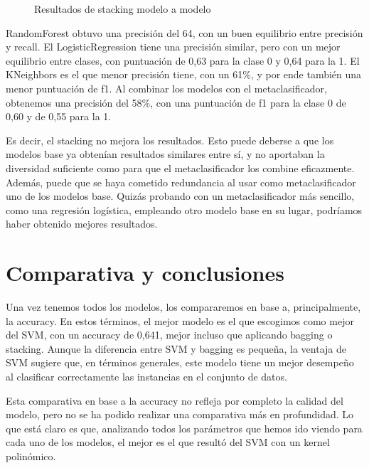 \documentclass[a4paper,onecolumn]{extarticle}
\let\stdsection\section
\renewcommand\section{\newpage\stdsection}
\begin{document}
\begin{sloppypar}
\begin{figure}[h!]
\begin{minipage}[c]{0.45\textwidth}
        \caption{Resultados de stacking modelo a modelo}
        \label{fig:stackingDetalle}
    \end{minipage}
\end{figure}

RandomForest obtuvo una precisión del 64, con un buen equilibrio entre precisión y recall. El LogisticRegression tiene una precisión similar, pero con un mejor 
equilibrio entre clases, con puntuación de 0,63 para la clase 0 y 0,64 para la 1. El KNeighbors es el que menor precisión tiene, con un 61\%, y por ende 
también una menor puntuación de f1. Al combinar los modelos con el metaclasificador, obtenemos una precisión del 58\%, con una puntuación de f1 para la clase 
0 de 0,60 y de 0,55 para la 1.

Es decir, el stacking no mejora los resultados. Esto puede deberse a que los modelos base ya obtenían resultados similares entre sí,
y no aportaban la diversidad suficiente como para que el metaclasificador los combine eficazmente. Además, puede que se haya cometido redundancia al usar como 
metaclasificador uno de los modelos base. Quizás probando con un metaclasificador más sencillo, como una regresión logística, empleando otro modelo base en su 
lugar, podríamos haber obtenido mejores resultados.

\section{Comparativa y conclusiones}\label{comparativa}
Una vez tenemos todos los modelos, los compararemos en base a, principalmente, la accuracy. En estos términos, el mejor modelo es el que escogimos como mejor 
del SVM, con un accuracy de 0,641, mejor incluso que aplicando bagging o stacking. Aunque la diferencia entre SVM y bagging es pequeña, la ventaja de SVM sugiere
que, en términos generales, este modelo tiene un mejor desempeño al clasificar correctamente las instancias en el conjunto de datos.

Esta comparativa en base a la accuracy no refleja por completo la calidad del modelo, pero no se ha podido realizar una comparativa más en profundidad. Lo que 
está claro es que, analizando todos los parámetros que hemos ido viendo para cada uno de los modelos, el mejor es el que resultó del SVM con un kernel polinómico.

\clearpage

%
\end{sloppypar}
\end{document}
